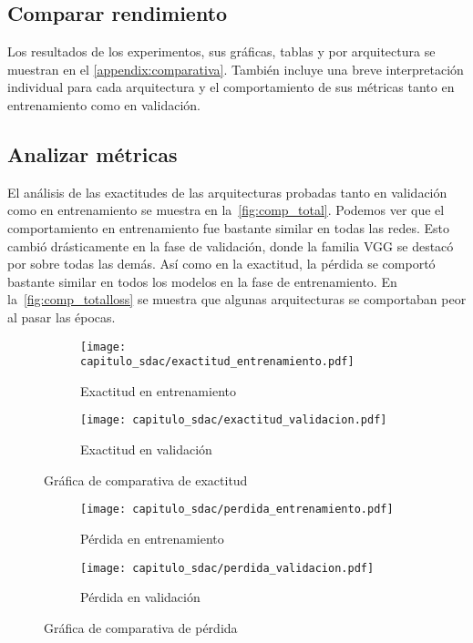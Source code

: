 \subsection{Comparar rendimiento}

Los resultados de los experimentos, sus gráficas, tablas y por arquitectura se
muestran en el \autoref{appendix:comparativa}. También incluye una breve
interpretación individual para cada arquitectura y el comportamiento de sus
métricas tanto en entrenamiento como en validación.

\subsection{Analizar métricas}

El análisis de las exactitudes de las arquitecturas probadas tanto en validación
como en entrenamiento se muestra en la~\autoref{fig:comp_total}. Podemos ver que
el comportamiento en entrenamiento fue bastante similar en todas las redes. Esto
cambió drásticamente en la fase de validación, donde la familia VGG se destacó
por sobre todas las demás. Así como en la exactitud, la pérdida se comportó
bastante similar en todos los modelos en la fase de entrenamiento. En
la~\autoref{fig:comp_totalloss} se muestra que algunas arquitecturas se
comportaban peor al pasar las épocas.

\begin{figure}[H]
    \centering
    \begin{subfigure}[b]{0.8\textwidth}
        \centering
       \texttt{[image: capitulo\_sdac/exactitud\_entrenamiento.pdf]}
       \caption{Exactitud en entrenamiento}
       \label{fig:comp_ent} 
    \end{subfigure}

    \begin{subfigure}[b]{0.8\textwidth}
        \centering
       \texttt{[image: capitulo\_sdac/exactitud\_validacion.pdf]}
       \caption{Exactitud en validación}
       \label{fig:comp_val}
    \end{subfigure}
    \caption{Gráfica de comparativa de exactitud}
    \label{fig:comp_total}
\end{figure}
\begin{figure}[H]
    \centering
    \begin{subfigure}[b]{0.8\textwidth}
        \centering
       \texttt{[image: capitulo\_sdac/perdida\_entrenamiento.pdf]}
       \caption{Pérdida en entrenamiento}
       \label{fig:comp_entloss} 
    \end{subfigure}

    \begin{subfigure}[b]{0.8\textwidth}
        \centering
       \texttt{[image: capitulo\_sdac/perdida\_validacion.pdf]}
       \caption{Pérdida en validación}
       \label{fig:comp_valloss}
    \end{subfigure}
    \caption{Gráfica de comparativa de pérdida}
    \label{fig:comp_totalloss}
\end{figure}

